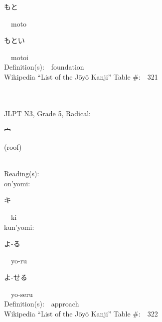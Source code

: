 \begin{multicols}{2}
{\hspace*{2em}}{\begin{CJK}{UTF8}{min} もと \end{CJK}}\ \ moto\ \ \\
{\hspace*{2em}}{\begin{CJK}{UTF8}{min} もとい \end{CJK}}\ \ motoi\ \ \\
Definition(s):\ \ foundation \\
Wikipedia ``List of the J\=oy\=o Kanji'' Table \#:\ \ 321 \\
\ \ \\
{\fontsize{34pt}{40pt}  }\ \ \\  %
{JLPT N3, Grade 5, Radical:\ \ {\begin{CJK}{UTF8}{min} 宀 \end{CJK}} (roof) } \\
Reading(s):\ \ \\
{\hspace*{1em}}on'yomi:\ \ \\
{\hspace*{2em}}{\begin{CJK}{UTF8}{min} キ \end{CJK}}\ \ ki\ \ \\
{\hspace*{1em}}kun'yomi:\ \ \\
{\hspace*{2em}}{\begin{CJK}{UTF8}{min} よ-る \end{CJK}}\ \ yo-ru\ \ \\
{\hspace*{2em}}{\begin{CJK}{UTF8}{min} よ-せる \end{CJK}}\ \ yo-seru\ \ \\
Definition(s):\ \ approach \\
Wikipedia ``List of the J\=oy\=o Kanji'' Table \#:\ \ 322 \\
\ \ \\
{\fontsize{34pt}{40pt}  }\ \ \\  %

\end{multicols}
